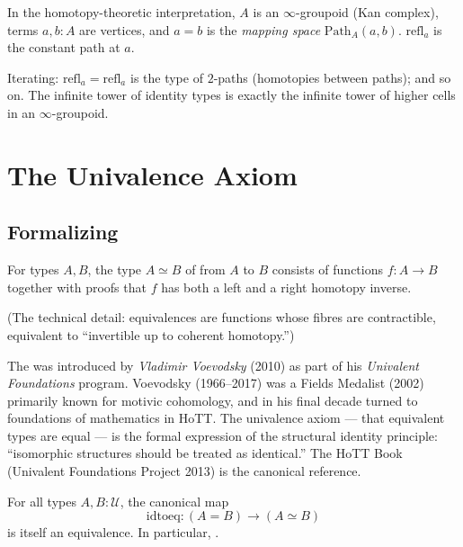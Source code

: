 \begin{remark}
In the homotopy-theoretic interpretation, $A$ is an $\infty$-groupoid
(Kan complex), terms $a, b : A$ are vertices, and $a = b$ is the
\emph{mapping space} $\mathrm{Path}_A(a, b)$. $\mathrm{refl}_a$ is the
constant path at $a$.

Iterating: $\mathrm{refl}_a = \mathrm{refl}_a$ is the type of $2$-paths
(homotopies between paths); and so on. The infinite tower of identity
types is exactly the infinite tower of higher cells in an
$\infty$-groupoid.
\end{remark}


\section{The Univalence Axiom}
\label{sec:univalence}

\subsection{Formalizing}

\begin{definition}
\label{def:equiv-types}
For types $A, B$, the type $A \simeq B$ of  from $A$
to $B$ consists of functions $f : A \to B$ together with proofs that $f$
has both a left and a right homotopy inverse.

(The technical detail: equivalences are functions whose fibres are
contractible, equivalent to ``invertible up to coherent homotopy.'')
\end{definition}

\begin{nameorigin}
The  was introduced by \emph{Vladimir Voevodsky}
(2010) as part of his \emph{Univalent Foundations} program. Voevodsky
(1966--2017) was a Fields Medalist (2002) primarily known for motivic
cohomology, and in his final decade turned to foundations of mathematics
in HoTT. The univalence axiom — that equivalent types are equal — is
the formal expression of the structural identity principle: ``isomorphic
structures should be treated as identical.'' The HoTT Book (Univalent
Foundations Project 2013) is the canonical reference.
\end{nameorigin}

\begin{theorem}
\label{thm:univalence}
For all types $A, B : \mathcal{U}$, the canonical map
\begin{equation*}
  \mathrm{idtoeq} : (A = B) \to (A \simeq B)
\end{equation*}
is itself an equivalence. In particular, .
\end{theorem}

